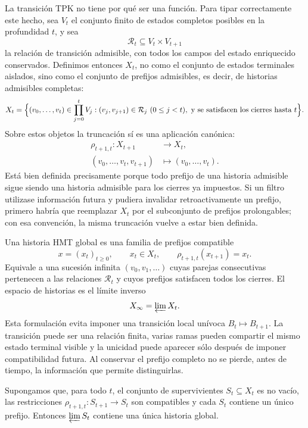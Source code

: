 La transición TPK no tiene por qué ser una función. Para tipar correctamente
este hecho, sea \(V_t\) el conjunto finito de estados completos posibles en
la profundidad \(t\), y sea
\[
\mathcal R_t\subseteq V_t\times V_{t+1}
\]
la relación de transición admisible, con todos los campos del estado
enriquecido conservados. Definimos entonces \(X_t\), no como el conjunto de
estados terminales aislados, sino como el conjunto de prefijos admisibles, es
decir, de historias admisibles completas:
\[
X_t=
\Bigl\{
(v_0,\ldots,v_t)\in\prod_{j=0}^{t}V_j:
(v_j,v_{j+1})\in\mathcal R_j\ (0\le j<t),
\ \text{y se satisfacen los cierres hasta }t
\Bigr\}.
\]
Sobre estos objetos la truncación sí es una aplicación canónica:
\[
\begin{aligned}
\rho_{t+1,t}:X_{t+1}&\longrightarrow X_t,\\
(v_0,\ldots,v_t,v_{t+1})&\longmapsto(v_0,\ldots,v_t).
\end{aligned}
\]
Está bien definida precisamente porque todo prefijo de una historia
admisible sigue siendo una historia admisible para los cierres ya impuestos.
Si un filtro utilizase información futura y pudiera invalidar
retroactivamente un prefijo, primero habría que reemplazar \(X_t\) por el
subconjunto de prefijos prolongables; con esa convención, la misma truncación
vuelve a estar bien definida.

Una historia HMT global es una familia de prefijos compatible
\[
x=(x_t)_{t\ge0},
\qquad
x_t\in X_t,
\qquad
\rho_{t+1,t}(x_{t+1})=x_t.
\]
Equivale a una sucesión infinita \((v_0,v_1,\ldots)\) cuyas parejas
consecutivas pertenecen a las relaciones \(\mathcal R_t\) y cuyos prefijos
satisfacen todos los cierres. El espacio de historias es el límite inverso
\[
X_\infty=\varprojlim X_t.
\]
Esta formulación evita imponer una transición local unívoca
\(B_t\mapsto B_{t+1}\). La transición puede ser una relación finita, varias
ramas pueden compartir el mismo estado terminal visible y la unicidad puede
aparecer sólo después de imponer compatibilidad futura. Al conservar el
prefijo completo no se pierde, antes de tiempo, la información que permite
distinguirlas.

\begin{theorem}
Supongamos que, para todo \(t\), el conjunto de supervivientes \(S_t\subseteq
X_t\) es no vacío, las restricciones
\(\rho_{t+1,t}:S_{t+1}\to S_t\) son compatibles y cada \(S_t\) contiene un
único prefijo. Entonces \(\varprojlim S_t\) contiene una única historia
global.
\end{theorem}

